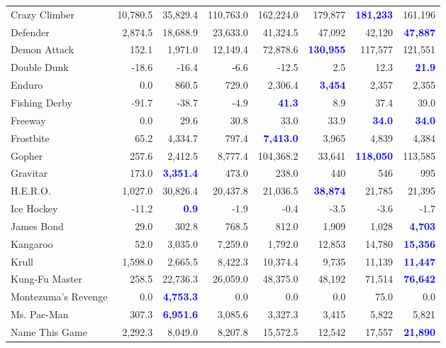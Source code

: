 \documentclass[letterpaper]{article}
\begin{document}
\begin{figure*}
\begin{tabular}{ l | r|r|r|r|r|r| r }
Crazy Climber & 10,780.5 & 35,829.4 & 110,763.0 & 162,224.0 & 179,877 & \textbf{\textcolor{blue}{181,233}} & 161,196 \\
Defender & 2,874.5 & 18,688.9 & 23,633.0 & 41,324.5 & 47,092 & 42,120 & \textbf{\textcolor{blue}{47,887}} \\
Demon Attack & 152.1 & 1,971.0 & 12,149.4 & 72,878.6 & \textbf{\textcolor{blue}{130,955}} & 117,577 & 121,551 \\
Double Dunk & -18.6 & -16.4 & -6.6 & -12.5 & 2.5 & 12.3 & \textbf{\textcolor{blue}{21.9}} \\
Enduro & 0.0 & 860.5 & 729.0 & 2,306.4 & \textbf{\textcolor{blue}{3,454}} & 2,357 & 2,355 \\
Fishing Derby & -91.7 & -38.7 & -4.9 & \textbf{\textcolor{blue}{41.3}} & 8.9 & 37.4 & 39.0 \\
Freeway & 0.0 & 29.6 & 30.8 & 33.0 & 33.9 & \textbf{\textcolor{blue}{34.0}} & \textbf{\textcolor{blue}{34.0}} \\
Frostbite & 65.2 & 4,334.7 & 797.4 & \textbf{\textcolor{blue}{7,413.0}} & 3,965 & 4,839 & 4,384 \\
Gopher & 257.6 & 2,412.5 & 8,777.4 & 104,368.2 & 33,641 & \textbf{\textcolor{blue}{118,050}} & 113,585 \\
Gravitar & 173.0 & \textbf{\textcolor{blue}{3,351.4}} & 473.0 & 238.0 & 440 & 546 & 995 \\
H.E.R.O. & 1,027.0 & 30,826.4 & 20,437.8 & 21,036.5 & \textbf{\textcolor{blue}{38,874}} & 21,785 & 21,395 \\
Ice Hockey & -11.2 & \textbf{\textcolor{blue}{0.9}} & -1.9 & -0.4 & -3.5 & -3.6 & -1.7 \\
James Bond & 29.0 & 302.8 & 768.5 & 812.0 & 1,909 & 1,028 & \textbf{\textcolor{blue}{4,703}} \\
Kangaroo & 52.0 & 3,035.0 & 7,259.0 & 1,792.0 & 12,853 & 14,780 & \textbf{\textcolor{blue}{15,356}} \\
Krull & 1,598.0 & 2,665.5 & 8,422.3 & 10,374.4 & 9,735 & 11,139 & \textbf{\textcolor{blue}{11,447}} \\
Kung-Fu Master & 258.5 & 22,736.3 & 26,059.0 & 48,375.0 & 48,192 & 71,514 & \textbf{\textcolor{blue}{76,642}} \\
Montezuma's Revenge & 0.0 & \textbf{\textcolor{blue}{4,753.3}} & 0.0 & 0.0 & 0.0 & 75.0 & 0.0 \\
Ms. Pac-Man & 307.3 & \textbf{\textcolor{blue}{6,951.6}} & 3,085.6 & 3,327.3 & 3,415 & 5,822 & 5,821 \\
Name This Game & 2,292.3 & 8,049.0 & 8,207.8 & 15,572.5 & 12,542 & 17,557 & \textbf{\textcolor{blue}{21,890}} \\

\end{tabular}
\end{figure*}
\end{document}
